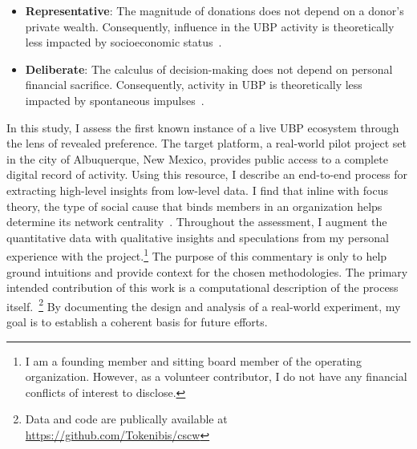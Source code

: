 \begin{itemize}
  \item \textbf{Representative}: The magnitude of donations does not depend on a donor's private wealth. Consequently, influence in the UBP activity is theoretically less impacted by socioeconomic status~\cite{james2007nature}.
  \item \textbf{Deliberate}: The calculus of decision-making does not depend on personal financial sacrifice. Consequently, activity in UBP is theoretically less impacted by spontaneous impulses~\cite{bennett2009impulsive}.
\end{itemize}

In this study, I assess the first known instance of a live UBP ecosystem through the lens of revealed preference.
The target platform, a real-world pilot project set in the city of Albuquerque, New Mexico, provides public access to a complete digital record of activity.
Using this resource, I describe an end-to-end process for extracting high-level insights from low-level data.
I find that inline with focus theory, the type of social cause that binds members in an organization helps determine its network centrality~\cite{feld1981focused}.
Throughout the assessment, I augment the quantitative data with qualitative insights and speculations from my personal experience with the project.\footnote{I am a founding member and sitting board member of the operating organization. However, as a volunteer contributor, I do not have any financial conflicts of interest to disclose.}
The purpose of this commentary is only to help ground intuitions and provide context for the chosen methodologies.
The primary intended contribution of this work is a computational description of the process itself.~\footnote{Data and code are publically available at \url{https://github.com/Tokenibis/cscw}}
By documenting the design and analysis of a real-world experiment, my goal is to establish a coherent basis for future efforts.
